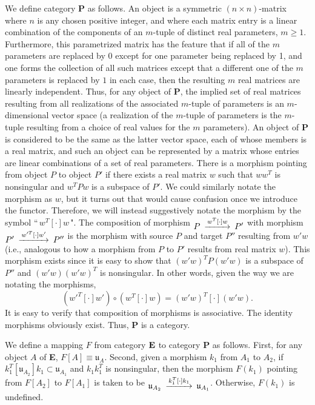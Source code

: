 \documentclass{amsart}
\theoremstyle{definition}
\numberwithin{theorem}{section}
\numberwithin{equation}{section}
\begin{document}
We define category {\bf P} as follows. An object is a symmetric $(n\times n)$-matrix where $n$ is any chosen positive integer, and where each matrix entry is a linear combination of the components of an $m$-tuple of distinct real parameters, $m\ge 1$.  Furthermore, this parametrized matrix has the feature that if all of the $m$ parameters are replaced by 0 except for one parameter being replaced by 1, and one forms the collection of all such matrices except that a different one of the $m$ parameters is replaced by $1$ in each case, then the resulting $m$ real matrices are linearly independent.  Thus, for any object of {\bf P}, the implied set of real matrices resulting from all realizations of the associated $m$-tuple of parameters is an $m$-dimensional vector space (a realization of the $m$-tuple of parameters is the $m$-tuple resulting from a choice of real values for the $m$ parameters).  An object of {\bf P} is considered to be the same as the latter vector space, each of whose members is a real matrix, and such an object can be represented by a matrix whose entries are linear combinations of a set of real parameters.   There is a morphism pointing from object $P$ to object $P'$ if there exists a real matrix $w$ such that $ww^T$ is nonsingular and $w^TPw$ is a subspace of $P'$.  We could similarly notate the morphism as $w$, but it turns out that would cause confusion once we introduce the functor.  Therefore, we will instead suggestively notate the morphism by the symbol ``\,$w^T[\cdot]w$\,".    The composition of morphism $\begin{CD}  P @>w^T[\cdot]w>> P'\end{CD}$ with morphism $\begin{CD}  P' @>w'^T[\cdot]w'>> P''\end{CD}$ is the morphism with source $P$ and target $P''$ resulting from $w'w$ (i.e., analogous to how a morphism from $P$ to $P'$ results from real matrix $w$).  This morphism exists since it is easy to show that $(w'w)^TP(w'w)$ is a subspace of $P''$ and $(w'w)(w'w)^T$ is nonsingular. In other words, given the way we are notating the morphisms, \begin{equation}\label{2/22/25.1}(w'^T[\cdot]w')\circ (w^T[\cdot]w) = (w'w)^T[\cdot](w'w).\end{equation} It is easy to verify that composition of morphisms is associative. The identity morphisms obviously exist. Thus, {\bf P} is a category.

We define a mapping $F$ from category ${\bf E}$ to category {\bf P} as follows.  First, for any object $A$ of {\bf E}, $F[
A] \equiv \mathfrak{u}_A$.  Second, given a morphism $k_1$ from $A_1$ to $A_2$, if $k_1^T[\mathfrak{u}_{A_2}]k_1 \subset \mathfrak{u}_{A_1}$ and $k_1k_1^T$ is nonsingular, then the morphism $F(k_1)$ pointing from $F[A_2]$ to $F[A_1]$ is taken to be $\begin{CD}  \mathfrak{u}_{A_2} @>k_1^T[\cdot]k_1>> \mathfrak{u}_{A_1}\end{CD}$.  Otherwise, $F(k_1)$ is undefined.
\end{document}
